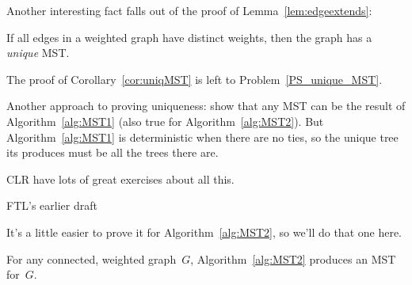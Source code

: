 Another interesting fact falls out of the proof of Lemma~\ref{lem:edgeextends}:
\begin{corollary}\label{cor:uniqMST}
If all edges in a weighted graph have distinct weights, then the graph has
a \emph{unique} MST.
\end{corollary}

The proof of Corollary~\ref{cor:uniqMST} is left to Problem~\ref{PS_unique_MST}.

\begin{editingnotes}
  Another approach to proving uniqueness: show that any MST can be the
  result of Algorithm~\ref{alg:MST1} (also true for
  Algorithm~\ref{alg:MST2}).  But Algorithm~\ref{alg:MST1} is
  deterministic when there are no ties, so the unique tree its
  produces must be all the trees there are.
\end{editingnotes}

\begin{editingnotes}
  CLR have lots of great exercises about all this.
\end{editingnotes}

\iffalse  FTL's earlier draft

It's a little easier
to prove it for Algorithm~\ref{alg:MST2}, so we'll do that one here.

\begin{theorem}\label{thm:MST2}
For any connected, weighted graph~$G$, Algorithm~\ref{alg:MST2}
produces an MST for~$G$.
\end{theorem}


